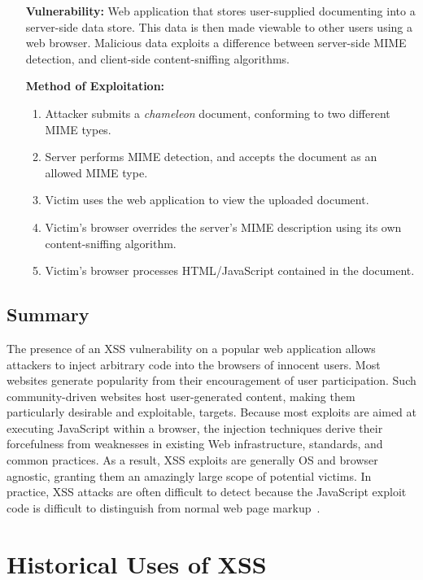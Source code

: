 \documentclass{acmtrans2m}
\begin{document}
\begin{itemize}
 \item[\textbf{Vulnerability:}] Web application that stores user-supplied documenting into a server-side data store.
This data is then made viewable to other users using a web browser.
Malicious data exploits a difference between server-side MIME detection, and client-side content-sniffing algorithms.
 \item[\textbf{Method of Exploitation:}]~
 \begin{enumerate}
  \item Attacker submits a \emph{chameleon} document, conforming to two different MIME types.
  \item Server performs MIME detection, and accepts the document as an allowed MIME type.
  \item Victim uses the web application to view the uploaded document.
  \item Victim's browser overrides the server's MIME description using its own content-sniffing algorithm.
  \item Victim's browser processes HTML/JavaScript contained in the document.
 \end{enumerate}
\end{itemize}

\subsection{Summary}

The presence of an XSS vulnerability on a popular web application allows attackers to inject arbitrary code into the browsers of innocent users.
Most websites generate popularity from their encouragement of user participation.
Such community-driven websites host user-generated content, making them particularly desirable and exploitable, targets.
Because most exploits are aimed at executing JavaScript within a browser, the injection techniques derive their forcefulness from weaknesses in existing Web infrastructure, standards, and common practices.
As a result, XSS exploits are generally OS and browser agnostic, granting them an amazingly large scope of potential victims.
In practice, XSS attacks are often difficult to detect because the JavaScript exploit code is difficult to distinguish from normal web page markup~\cite{xss-history}.

\section{Historical Uses of XSS}\label{sec:xss-uses}
\end{document}
